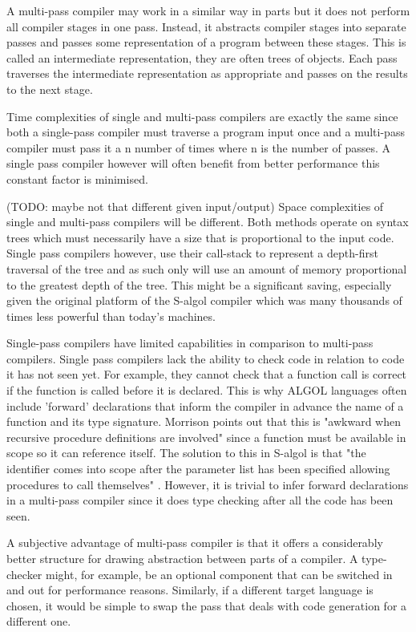 \documentclass{article}
\begin{document}
A multi-pass compiler may work in a similar way in parts but it does not perform all compiler stages in one pass. Instead, it abstracts compiler stages into separate passes and passes some representation of a program between these stages. This is called an intermediate representation, they are often trees of objects. Each pass traverses the intermediate representation as appropriate and passes on the results to the next stage.

Time complexities of single and multi-pass compilers are exactly the same since both a single-pass compiler must traverse a program input once and a multi-pass compiler must pass it a n number of times where n is the number of passes. A single pass compiler however will often benefit from better performance this constant factor is minimised.

(TODO: maybe not that different given input/output) Space complexities of single and multi-pass compilers will be different. Both methods operate on syntax trees which must necessarily have a size that is proportional to the input code. Single pass compilers however, use their call-stack to represent a depth-first traversal of the tree and as such only will use an amount of memory proportional to the greatest depth of the tree. This might be a significant saving, especially given the original platform of the S-algol compiler which was many thousands of times less powerful than today's machines.

Single-pass compilers have limited capabilities in comparison to multi-pass compilers. Single pass compilers lack the ability to check code in relation to code it has not seen yet. For example, they cannot check that a function call is correct if the function is called before it is declared. This is why ALGOL languages often include 'forward' declarations that inform the compiler in advance the name of a function and its type signature. Morrison points out that this is "awkward when recursive procedure definitions are involved" since a function must be available in scope so it can reference itself. The solution to this in S-algol is that "the identifier comes into scope after the parameter list has been specified allowing procedures to call themselves" \cite{morrison1979development}. However, it is trivial to infer forward declarations in a multi-pass compiler since it does type checking after all the code has been seen.

A subjective advantage of multi-pass compiler is that it offers a considerably better structure for drawing abstraction between parts of a compiler. A type-checker might, for example, be an optional component that can be switched in and out for performance reasons. Similarly, if a different target language is chosen, it would be simple to swap the pass that deals with code generation for a different one.
\end{document}

